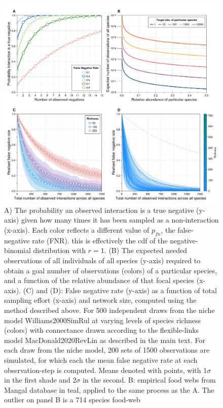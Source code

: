 \documentclass[10pt,oneside]{article}
\makeatletter
\def\maxwidth{\ifdim\Gin@nat@width>\linewidth\linewidth
\else\Gin@nat@width\fi}
\let\Oldincludegraphics\includegraphics
\renewcommand{\includegraphics}[1]{\Oldincludegraphics[width=\maxwidth]{#1}}
\makeatother
\begin{document}
\begin{figure}
\hypertarget{fig:fig1}{%
\centering
\includegraphics{./figures/fig1.png}
\caption{A) The probability an observed interaction is a true negative
(y-axis) given how many times it has been sampled as a non-interaction
(x-axis). Each color reflects a different value of \(p_{fn}\), the
false-negative rate (FNR). this is effectively the cdf of the
negative-binomial distribution with \(r=1\). (B) The expected needed
observations of all individuals of all species (y-axis) required to
obtain a goal number of observations (colors) of a particular species,
and a function of the relative abundance of that focal species (x-axis).
(C) and (D): False negative rate (y-axis) as a function of total
sampling effort (x-axis) and network size, computed using the method
described above. For 500 independent draws from the niche model
Williams2000SimRul at varying levels of species richness (colors) with
connectance drawn according to the flexible-links model
MacDonald2020RevLin as described in the main text. For each draw from
the niche model, 200 sets of 1500 observations are simulated, for which
each the mean false negative rate at each observation-step is computed.
Means denoted with points, with \(1\sigma\) in the first shade and
\(2\sigma\) in the second. B: empirical food webs from Mangal database
in teal, applied to the same process as the A. The outlier on panel B is
a 714 species food-web}\label{fig:fig1}
}
\end{figure}
\end{document}

